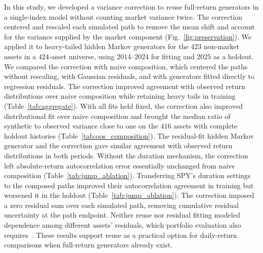 In this study, we developed a variance correction to reuse full-return
generators in a single-index model without counting market variance
twice. The correction centered and rescaled each simulated path to
remove the mean shift and account for the variance supplied by the
market component
(Fig.~\ref{fig:preservation}). We applied it to heavy-tailed hidden
Markov generators for the $423$ non-market assets in a $424$-asset
universe, using $2014$--$2024$ for fitting and $2025$ as a holdout.
We compared the correction with naive composition, which centered the
paths without rescaling, with Gaussian residuals, and with generators
fitted directly to regression residuals. The correction improved
agreement with observed return distributions over naive composition
while retaining heavy tails in training (Table~\ref{tab:aggregate}).
With all fits held fixed, the correction also improved distributional
fit over naive composition and
brought the median ratio of synthetic to observed variance close to
one on the $416$ assets with complete holdout histories
(Table~\ref{tab:oos_composition}). The residual-fit hidden Markov
generator and the correction gave similar agreement with observed
return distributions in both periods. Without the duration mechanism, the correction left absolute-return
autocorrelation error essentially unchanged from naive composition (Table~\ref{tab:jump_ablation}).
Transferring SPY's duration settings to the composed paths improved
their autocorrelation agreement in training but worsened it in the
holdout (Table~\ref{tab:jump_ablation}).
The correction imposed a zero residual sum over each simulated path,
removing cumulative residual uncertainty at the path endpoint. Neither reuse nor residual
fitting modeled dependence among different assets' residuals, which
portfolio evaluation also requires~\cite{embrechtsMcNeilStraumann2002,
boucheyNemtchinovWong2015}. These results support reuse as a practical
option for daily-return comparisons when full-return generators
already exist.
